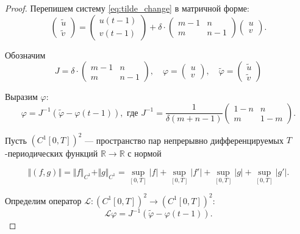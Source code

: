 \begin{proof}
	Перепишем систему \eqref{eq:tilde_change} в матричной форме:
	\[
	\begin{pmatrix}
		\tilde{u}\\
		\tilde{v}
	\end{pmatrix} = 
	\begin{pmatrix}
		u(t - 1)\\
		v(t - 1)
	\end{pmatrix} +
	\delta \cdot
	\begin{pmatrix}
		m - 1 & n \\
		m & n - 1
	\end{pmatrix}
	\begin{pmatrix}
		u\\
		v
	\end{pmatrix}.
	\]
	
	Обозначим
	\[
	J = 
	\delta \cdot
	\begin{pmatrix}
		m - 1 & n \\
		m & n - 1
	\end{pmatrix}, \quad
	\varphi =
	\begin{pmatrix}
		u\\
		v
	\end{pmatrix}, \quad
	\tilde{\varphi} =
	\begin{pmatrix}
		\tilde{u}\\
		\tilde{v}
	\end{pmatrix}
	\]
	
	Выразим $\varphi$:
	\begin{equation}
		\label{eq:tilde_matrix_form}
		\varphi = 
		J^{-1}
		\left(
		\tilde{\varphi} -
		\varphi(t - 1)
		\right),
		\text{ где }
		J^{-1} = \dfrac{1}{\delta(m + n - 1)} 
		\begin{pmatrix}
			1 - n & n \\
			m & 1 - m
		\end{pmatrix}.
	\end{equation}
	
	Пусть $(C^1[0, T])^2$ --- пространство пар непрерывно дифференцируемых $T$-периодических функций $\mathbb{R} \to \mathbb{R}$ с нормой
	
	\[\Vert (f, g) \Vert = \Vert f \Vert_{C^1} + \Vert g \Vert_{C^1} = \sup\limits_{[0, T]} |f| + \sup\limits_{[0, T]} |f'| + \sup\limits_{[0, T]} |g| + \sup\limits_{[0, T]} |g'|.\]
	
	Определим оператор $\mathcal{L}:(C^1[0, T])^2 \to (C^1[0, T])^2$:
	\[\mathcal{L}\varphi = J^{-1} \left(\tilde{\varphi} - \varphi(t - 1) \right).\]
	

\end{proof}
